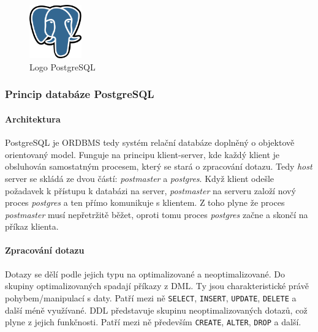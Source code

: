 \documentclass[a4paper,12pt,oneside]{report}
\begin{document}
\begin{figure}[h!]
    \centering
    \includegraphics[width=0.2\textwidth]{./img/implementace/postgresql.png}
    \caption[Logo PostgreSQL]{\centering Logo PostgreSQL }
 \end{figure}   


\subsubsection{Princip databáze PostgreSQL}
\paragraph*{Architektura}
PostgreSQL je \ac{ORDBMS} tedy systém relační databáze doplněný o objektově orientovaný model. Funguje na principu klient-server, kde každý klient je obsluhován samostatným procesem, který se stará o zpracování dotazu. Tedy \textit{host} server se skládá ze dvou částí: \textit{postmaster} a \textit{postgres}.  Když klient odešle požadavek k přístupu k databázi na server, \textit{postmaster} na serveru založí nový proces \textit{postgres} a ten přímo komunikuje s klientem. Z toho plyne že proces \textit{postmaster} musí nepřetržitě běžet, oproti tomu  proces \textit{postgres} začne a skončí na příkaz klienta. 


\paragraph*{Zpracování dotazu}
Dotazy se dělí podle jejich typu na optimalizované a neoptimalizované. Do skupiny optimalizovaných spadají příkazy z \ac{DML}. Ty jsou charakteristické právě pohybem/manipulací s daty. Patří mezi ně \texttt{SELECT}, \texttt{INSERT}, \texttt{UPDATE}, \texttt{DELETE} a další méně využívané. \acs{DDL}  představuje skupinu neoptimalizovaných dotazů, což plyne z jejich funkčnosti. Patří mezi ně především \texttt{CREATE}, \texttt{ALTER}, \texttt{DROP} a další. \cite{bares}
\end{document}
